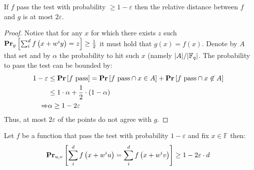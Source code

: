 \begin{claim}
  If $f$ pass the test with probability $\ge 1 - \varepsilon$ then the relative distance between $f$ and $g$ is at most $2\varepsilon$.
\end{claim}

\begin{proof}
  Notice that for any $x$ for  which there exists $z$ such $\prbm{ \sum_{i}^{d}{f\left( x + w^{i}y \right) = z }}{y} \ge \frac{1}{2}$ it must hold that $g(x) = f(x)$. Denote by $A$ that set and by $\alpha$ the probability to hit such $x$ (namely $|A| / |\FF|$. The probability to pass the test can be bounded by:  
  \begin{equation*}
    \begin{split}
      1- \varepsilon & \le \prb{ f \text{ pass}} = \prb{ f \text{ pass} \cap x \in A } + \prb{ f \text{ pass} \cap x \not\in A} \\
      & \le 1 \cdot \alpha + \frac{1}{2} \cdot \left( 1 -\alpha \right) \\
      \Rightarrow & \alpha \ge 1 - 2\varepsilon 
    \end{split}
  \end{equation*}
  Thus, at most $2\varepsilon$ of the points do not agree with $g$. 
\end{proof}

\begin{claim}
  Let $f$ be a function that pass the test with probability $1-\varepsilon$ and fix $x \in \mathbb{F}$ then: 
\begin{equation*}
  \begin{split}
    \prbm{  \sum_{i}^{d}{f\left( x + w^{i}u \right)} = \sum_{i}^{d}{f\left( x + w^{i}v \right)} }{ u,v} \ge 1 - 2\varepsilon \cdot d
  \end{split}
\end{equation*}
\end{claim}

